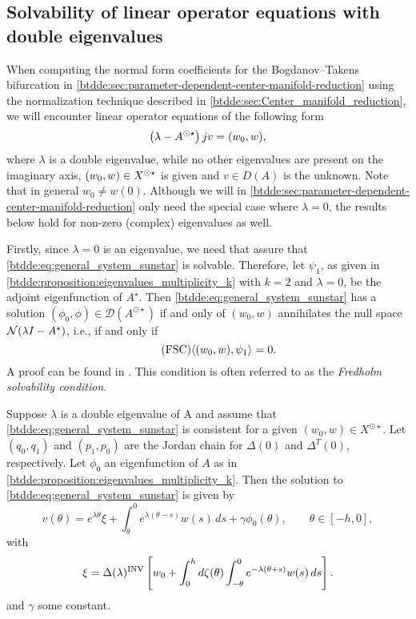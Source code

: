 \subsection{Solvability of linear operator equations with double eigenvalues}
\label{btdde:sec:solvability}

When computing the normal form coefficients for the Bogdanov--Takens
bifurcation in \cref{btdde:sec:parameter-dependent-center-manifold-reduction} using
the normalization technique described in \cref{btdde:sec:Center_manifold_reduction},
we will encounter linear operator equations of the following form
\begin{equation}
  \label{btdde:eq:general_system_sunstar}
  \left( \lambda - A^{\odot\star} \right)j v = (w_0,w),
\end{equation}
where $\lambda$ is a double eigenvalue, while no other eigenvalues are present
on the imaginary axis, $(w_0,w) \in X^{\odot\star}$ is given and $v \in D(A)$ is
the unknown. Note that in general $w_0 \neq w(0)$. Although we will in
\cref{btdde:sec:parameter-dependent-center-manifold-reduction} only need the special
case where $\lambda = 0$, the results below hold for non-zero (complex)
eigenvalues as well.

Firstly, since $\lambda = 0$ is an eigenvalue, we need that assure that
\cref{btdde:eq:general_system_sunstar} is solvable. Therefore, let $\psi_1$, as given
in \cref{btdde:proposition:eigenvalues_multiplicity_k} with $k=2$ and $\lambda=0$, be
the adjoint eigenfunction of $A^\star$. Then
\cref{btdde:eq:general_system_sunstar} has a solution
$(\phi_{0},\phi)\in\mathcal{D}(A^{\odot\star})$ if and only of $(w_0,w)$
annihilates the null space $\mathcal N(\lambda I-A^{\star})$, i.e., if and only
if 
\begin{equation}\tag{FSC}
  \label{btdde:eq:FSC}
  \langle (w_0,w),\psi_1 \rangle_{} = 0.
\end{equation}
A proof can be found in \cite[Lemma 3.2]{Janssens:Thesis}. This condition is
often referred to as the \emph{Fredholm solvability condition}. 

\begin{proposition}
\label{btdde:prop:solution_double_eig}
Suppose $\lambda$ is a double eigenvalue of A and assume that
\cref{btdde:eq:general_system_sunstar} is consistent for a given $(w_0,w)\in
X^{\odot\star}$. Let $(q_0,q_1)$ and $(p_1,p_0)$ are the Jordan chain for
$\Delta(0)$ and $\Delta^T(0)$, respectively. Let $\phi_0$ an eigenfunction of
$A$ as in \cref{btdde:proposition:eigenvalues_multiplicity_k}. Then the solution to
\cref{btdde:eq:general_system_sunstar} is given by
\[
v(\theta) = e^{\lambda\theta}\xi +
            \int_{\theta}^{0}e^{\lambda(\theta-s)}w(s)\,ds + 
            \gamma \phi_0(\theta),
            \qquad\theta\in[-h,0],
\]
with
\[
\xi = \Delta(\lambda)^{\mathrm{INV}}\left[
            w_0 + 
            \int_{0}^{h}d\zeta(\theta) 
                \int_{-\theta}^{0}e^{-\lambda (\theta + s)}w(s) \,ds
       \right].
\]
and $\gamma$ some constant. 
\end{proposition}

